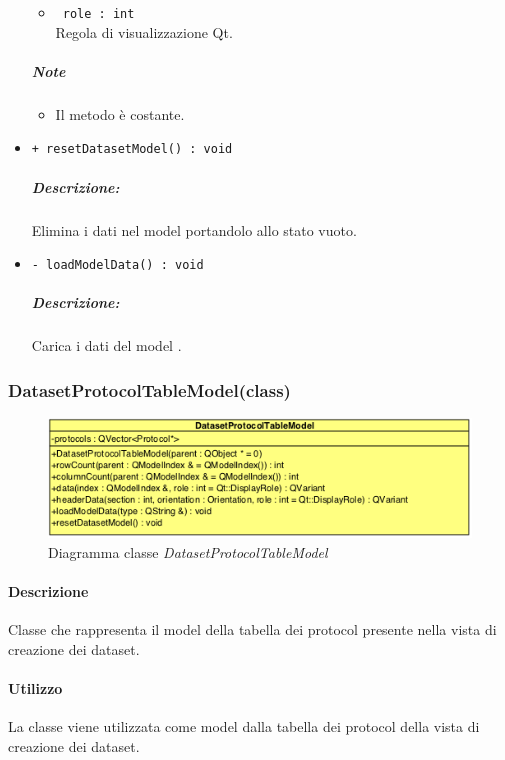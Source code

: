 \begin{itemize}
\begin{itemize}
			\item \color{RoyalPurple}\verb! role : int!\\
			\color{black}Regola di visualizzazione Qt\g{}.
		\end{itemize}
	\subparagraph{Note}
			\begin{itemize}
				\item Il metodo è costante.
			\end{itemize}
		
	\item \color{blue}\verb!+ resetDatasetModel() : void!\\
		\color{black}
		\subparagraph{Descrizione:} Elimina i dati nel model portandolo allo stato vuoto.\\
			
	\item \color{blue}\verb!- loadModelData() : void!\\
		\color{black}
		\subparagraph{Descrizione:} Carica i dati del model .\\
\end{itemize}
\pagebreak


\subsubsection{DatasetProtocolTableModel(class)}
\label{DatasetProtocolTableModel}
\begin{figure}[!h]
	\centering
	\includegraphics[width=0.6\linewidth]{./Content/Immagini/QtModel/DatasetProtocolTableModel.png}
	\caption{Diagramma classe \textsl{DatasetProtocolTableModel}}
	\label{comp_DatasetProtocolTableModel}
\end{figure}

\paragraph{Descrizione\\} 
Classe che rappresenta il model della tabella dei protocol\g{} presente nella vista di creazione dei dataset\g{}.

\paragraph{Utilizzo\\}
La classe viene utilizzata come model dalla tabella dei protocol\g{} della vista di creazione dei dataset\g{}.

